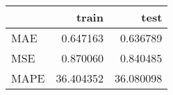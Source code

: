 \begin{tabular}{lrr}
\toprule
{} &      train &       test \\
\midrule
MAE  &   0.647163 &   0.636789 \\
MSE  &   0.870060 &   0.840485 \\
MAPE &  36.404352 &  36.080098 \\
\bottomrule
\end{tabular}
